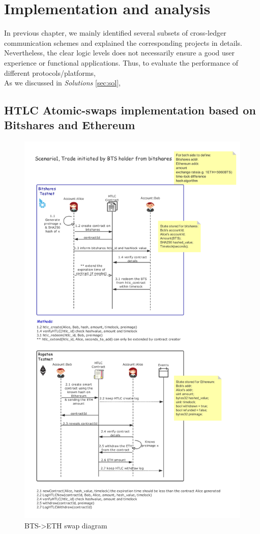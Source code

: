 \chapter{Implementation and analysis} 
\label{chap:4}
\noindent In previous chapter, we mainly identified several subsets of cross-ledger communication schemes and explained the corresponding projects in details. Nevertheless, the clear logic levels does not necessarily ensure a good user experience or functional applications. Thus, to evaluate the performance of different protocols/platforms, \\
\noindent As we discussed in \textit{Solutions} \ref{sec:sol}, 

\section{HTLC Atomic-swaps implementation based on Bitshares and Ethereum}
\noindent 
\newpage
\begin{figure}[H]
	\includegraphics[width=1\textwidth]{./figures/BTS-ETH_diagram}
        \centering
        \caption{BTS->ETH swap diagram}
        \centering
        \label{fig:success}

\end{figure}
